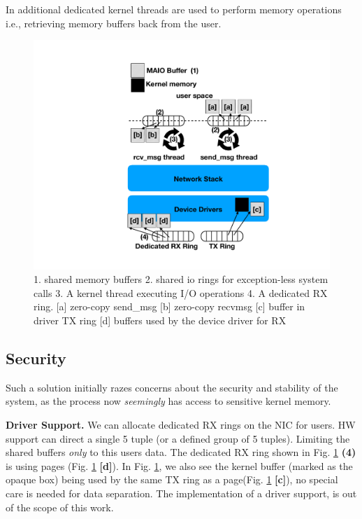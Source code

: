 In additional dedicated kernel threads are used to perform memory operations i.e., retrieving memory buffers back from the user.%

\begin{figure}[t]
    \centering
    \includegraphics[width=0.8\columnwidth]{ktcp_z.pdf}
    \caption{1. \oursys shared memory buffers 2. shared io rings for exception-less system calls 3. A kernel thread executing I/O operations 4. A dedicated RX ring.
    [a] zero-copy send\_msg [b] zero-copy recvmsg [c] \oursys buffer in driver TX ring [d] \oursys buffers used by the device driver for RX}
    \label{fig:our_sys}
\end{figure} 

\subsection{Security}
Such a solution initially razes concerns about the security and stability of the system, as the process now \emph{seemingly} has access to sensitive kernel memory. 

\noindent\textbf{Driver Support.} We can allocate dedicated RX rings on the NIC for \oursys users. HW support\cite{flow_direct} can direct a single 5 tuple (or a defined group of 5 tuples). Limiting the shared buffers \emph{only} to this users data. The dedicated RX ring shown in Fig. \ref{fig:our_sys} \textbf{(4)} is using \oursys pages (Fig. \ref{fig:our_sys} \textbf{[d]}). In Fig. \ref{fig:our_sys}, we also see the kernel buffer (marked as the opaque box) being used by the same TX ring as a \oursys page(Fig. \ref{fig:our_sys} \textbf{[c]}), no special care is needed for data separation. The implementation of a driver support, is out of the scope of this work. 

